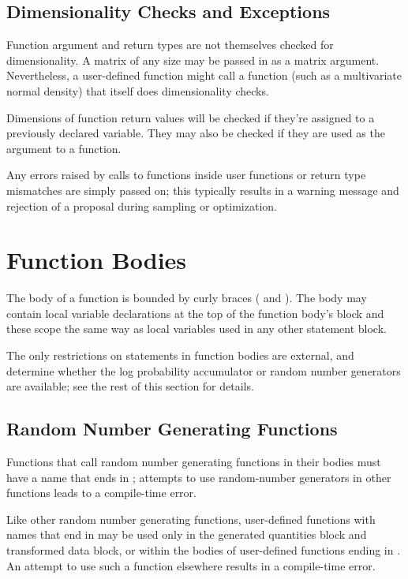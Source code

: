 \subsection{Dimensionality Checks and Exceptions}

Function argument and return types are not themselves checked for
dimensionality.  A matrix of any size may be passed in as a matrix
argument.  Nevertheless, a user-defined function might call a function
(such as a multivariate normal density) that itself does
dimensionality checks.

Dimensions of function return values will be checked if they're
assigned to a previously declared variable.  They may also be checked
if they are used as the argument to a function.

Any errors raised by calls to functions inside user functions or
return type mismatches are simply passed on;  this typically results
in a warning message and rejection of a proposal during sampling or
optimization.

\section{Function Bodies}\label{function-bodies.section}

The body of a function is bounded by curly braces (\code{\{} and
\code{\}}).  The body may contain local variable declarations at the
top of the function body's block and these scope the same way as local
variables used in any other statement block.

The only restrictions on statements in function bodies are external,
and determine whether the log probability accumulator or random
number generators are available;  see the rest of this section for details.

\subsection{Random Number Generating Functions}

Functions that call random number generating functions in their bodies
must have a name that ends in ; attempts to use
random-number generators in other functions leads to a compile-time
error.

Like other random number generating functions, user-defined functions
with names that end in  may be used only in the generated
quantities block and transformed data block, or within the bodies of
user-defined functions ending in .  An attempt to use such
a function elsewhere results in a compile-time error.


